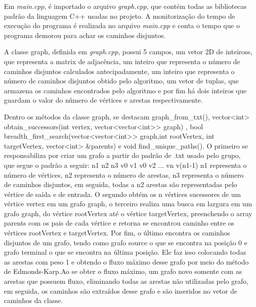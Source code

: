 Em \textit{main.cpp}, é importado o arquivo \textit{graph.cpp}, que contém todas as bibliotecas 
padrão da linguagem C++ usadas no projeto. A monitorização do tempo de execução do programa
é realizada no arquivo \textit{main.cpp} e conta o tempo que o programa demorou para achar os 
caminhos disjuntos.

A classe graph, definida em \textit{graph.cpp}, possui 5 campos, um vetor 2D de inteiross, 
que representa a matrix de adjacência, um inteiro que representa o número de caminhos disjuntos
calculados antecipadamente, um inteiro que representa o número de caminhos disjuntos obtido pelo
algoritmo, um vetor de tuplas, que armazena os caminhos encontrados pelo algoritmo e por fim
há dois inteiros que guardam o valor do número de vértices e arestas respectivamente.

\newpage
Dentro os métodos da classe graph, se destacam graph\_from\_txt(), 
vector<int> obtain\_successors(int vertex, vector<vector<int>> graph) , 
bool breadth\_first\_search(vector<vector<int>> graph,int rootVertex, int targetVertex, vector<int> \&parents) e
void find\_unique\_paths(). O primeiro se responsabiliza por criar um grafo a partir do padrão de .txt
usado pelo grupo, que segue o padrão a seguir: \newline
n1 n2 n3\newline
v0 v1\newline
v0 v2\newline
...\newline
vn v(n1-1)\newline
\newline
n1 representa o número de vértices, n2 representa o número de arestas, n3 representa o número de 
caminhos disjuntos, em seguida, todas a n2 arestas são representadas pelo vértice de saída e de 
entrada.\newline
O segundo obtém os n vértices sucessores de um vértice vertex em um grafo graph, o terceiro 
realiza uma busca em largura em um grafo graph, do vértice rootVertex até o vértice targetVertex,
preenchendo o array parents com os pais de cada vértice e retorna se encontrou caminho entre os
vértices rootVertex e targetVertex. Por fim, o último encontra os caminhos disjuntos de um grafo,
tendo como grafo source o que se encontra na posição 0 e grafo terminal o que se encontra na última
posição. Ele faz isso colocando todas as arestas com peso 1 e obtendo o fluxo máximo desse grafo por meio
do método de Edmonds-Karp\cite{gfg}.Ao se obter o fluxo máximo, um grafo novo somente com as arestas que  possuem fluxo, eliminando todas as arestas não utilizadas pelo grafo, em seguida, os caminhos são extraídos desse grafo e são inseridos no vetor de caminhos da classe.




